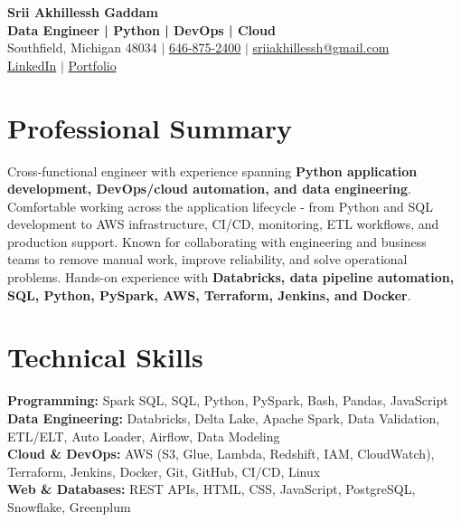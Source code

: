 \documentclass[letterpaper,10pt]{article}
\begin{document}
\fontsize{9.35pt}{10.45pt}\selectfont

\begin{center}
    {\LARGE \textbf{Srii Akhillessh Gaddam}} \\[-1pt]
    \textbf{Data Engineer | Python | DevOps | Cloud} \\[2pt]
    Southfield, Michigan 48034 $|$
    \href{tel:6468752400}{646-875-2400} $|$
    \href{mailto:sriiakhillessh@gmail.com}{sriiakhillessh@gmail.com} \\[1pt]
    \href{https://www.linkedin.com/in/srii-akhiilessh-gaddam-b48668191/}{LinkedIn} $|$
    \href{https://sriiakhillesshg.github.io/portfolio/}{Portfolio}
\end{center}
\vspace{-8pt}

\section{Professional Summary}
\small{Cross-functional engineer with experience spanning \textbf{Python application development, DevOps/cloud automation, and data engineering}. Comfortable working across the application lifecycle - from Python and SQL development to AWS infrastructure, CI/CD, monitoring, ETL workflows, and production support. Known for collaborating with engineering and business teams to remove manual work, improve reliability, and solve operational problems. Hands-on experience with \textbf{Databricks, data pipeline automation, SQL, Python, PySpark, AWS, Terraform, Jenkins, and Docker}.}

\section{Technical Skills}
\small{
\textbf{Programming:} Spark SQL, SQL, Python, PySpark, Bash, Pandas, JavaScript \\
\textbf{Data Engineering:} Databricks, Delta Lake, Apache Spark, Data Validation, ETL/ELT, Auto Loader, Airflow, Data Modeling \\
\textbf{Cloud \& DevOps:} AWS (S3, Glue, Lambda, Redshift, IAM, CloudWatch), Terraform, Jenkins, Docker, Git, GitHub, CI/CD, Linux \\
\textbf{Web \& Databases:} REST APIs, HTML, CSS, JavaScript, PostgreSQL, Snowflake, Greenplum
}

\end{document}
